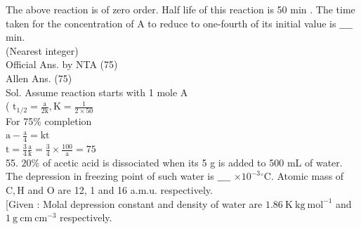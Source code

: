 \documentclass[10pt]{article}
\begin{document}
The above reaction is of zero order. Half life of this reaction is 50 min . The time taken for the concentration of A to reduce to one-fourth of its initial value is \(\_\_\_\_\) min.\\
(Nearest integer)\\
Official Ans. by NTA (75)\\
Allen Ans. (75)\\
Sol. Assume reaction starts with 1 mole A\\
( \(\mathrm{t}_{1 / 2}=\frac{\mathrm{a}}{2 \mathrm{k}}, \mathrm{K}=\frac{1}{2 \times 50}\)\\
For 75\% completion\\
\(\mathrm{a}-\frac{\mathrm{a}}{4}=\mathrm{kt}\)\\
\(\mathrm{t}=\frac{3}{4} \frac{\mathrm{a}}{\mathrm{k}}=\frac{3}{4} \times \frac{100}{\mathrm{a}}=75\)\\
55. \(20 \%\) of acetic acid is dissociated when its 5 g is added to 500 mL of water. The depression in freezing point of such water is \(\_\_\_\_\) \(\times 10^{-3}{ }^{\circ} \mathrm{C}\). Atomic mass of \(\mathrm{C}, \mathrm{H}\) and O are 12, 1 and 16 a.m.u. respectively.\\[0pt]
[Given : Molal depression constant and density of water are \(1.86 \mathrm{~K} \mathrm{~kg} \mathrm{~mol}^{-1}\) and \(1 \mathrm{~g} \mathrm{~cm} \mathrm{~cm}^{-3}\) respectively.
\end{document}
